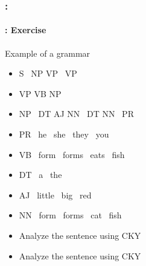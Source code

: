 \documentclass[xcolor=table]{beamer}
\begin{document}
\begin{frame}
	\frametitle{\insertshortsubtitle: \insertsection}
	\framesubtitle{\insertsubsection: Exercise}

	\begin{exampleblock}{Example of a grammar}
		\begin{itemize}
			\item S \textrightarrow\ NP VP \textbar\ VP
			\item VP \textrightarrow VB NP
			\item NP \textrightarrow\ DT AJ NN \textbar\ DT NN \textbar\ PR 
			\item PR \textrightarrow\ he \textbar\ she \textbar\ they \textbar\ you
			\item VB \textrightarrow\ form \textbar\ forms \textbar\ eats \textbar\ fish
			\item DT \textrightarrow\ a \textbar\ the
			\item AJ \textrightarrow\ little \textbar\ big \textbar\ red 
			\item NN \textrightarrow\ form \textbar\ forms \textbar\ cat \textbar\ fish
		\end{itemize}
	\end{exampleblock}\vspace{-6pt}
	
	\begin{itemize}
		\item Analyze the sentence  using CKY 
		\item Analyze the sentence  using CKY
	\end{itemize}

\end{frame}
\end{document}

